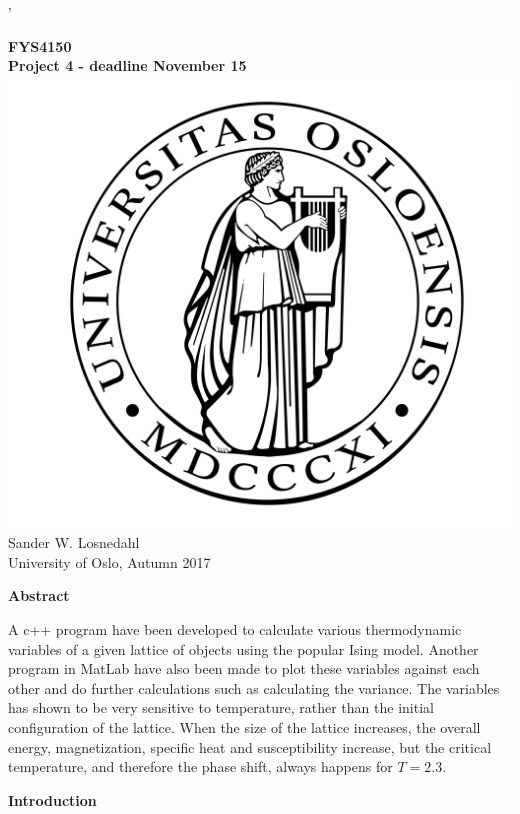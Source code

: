 \documentclass[10pt,a4paper]{article}
\begin{document}
'
\begin{center}
{\LARGE\bf
FYS4150\\
Project 4 - deadline November 15
}
\\
 \includegraphics[scale=0.1]{uio.png}\\
Sander W. Losnedahl\\
University of Oslo, Autumn 2017
 
\end{center}

\begin{center}
{\Large\bf Abstract}
\end{center}

\noindent A c++ program have been developed to calculate various thermodynamic variables of a given lattice of objects using the popular Ising model. Another program in MatLab have also been made to plot these variables against each other and do further calculations such as calculating the variance. The variables has shown to be very sensitive to temperature, rather than the initial configuration of the lattice. When the size of the lattice increases, the overall energy, magnetization, specific heat and susceptibility increase, but the critical temperature, and therefore the phase shift, always happens for $T = 2.3$.

\newpage

\begin{center}
{\LARGE\bf Introduction}
\end{center}
\end{document}
